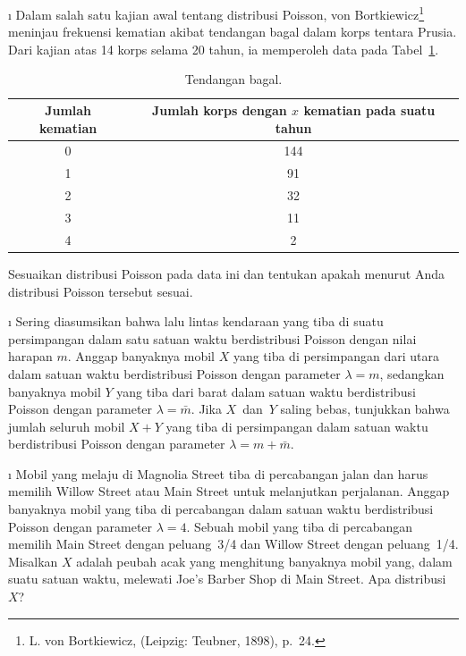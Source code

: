 \begin{LJSItem}
\i\label{exer 9.2.20} Dalam salah satu kajian awal tentang distribusi Poisson, von
Bortkiewicz\footnote{L. von Bortkiewicz,   (Leipzig: Teubner, 1898), p.\ 24.} meninjau frekuensi kematian akibat
tendangan bagal dalam korps tentara Prusia. Dari kajian atas
14 korps selama 20 tahun, ia memperoleh data pada Tabel~\ref{table 5.5}.
\begin{table}
\centering
\begin{tabular}{|c|c|}
\hline Jumlah kematian & Jumlah korps dengan $x$ kematian pada suatu tahun \\ \hline 
0 & 144 \\
1 & \hspace{.1in}91 \\ 
2 & \hspace{.1in}32 \\ 
3 & \hspace{.12in}11 \\ 
4 & \hspace{.18in}2 \\ \hline
\end{tabular}
\caption{Tendangan bagal.}
\label{table 5.5}
\end{table}
Sesuaikan distribusi Poisson pada data ini dan tentukan apakah menurut Anda distribusi
Poisson tersebut sesuai.

\i\label{exer 9.2.21} Sering diasumsikan bahwa lalu lintas kendaraan yang tiba di
suatu persimpangan dalam satu satuan waktu berdistribusi Poisson dengan nilai harapan
$m$. Anggap banyaknya mobil $X$ yang tiba di persimpangan dari utara dalam satuan
waktu berdistribusi Poisson dengan parameter $\lambda = m$, sedangkan banyaknya mobil
$Y$ yang tiba dari barat dalam satuan waktu berdistribusi Poisson dengan parameter
$\lambda = \bar m$. Jika $X$~dan~$Y$ saling bebas, tunjukkan bahwa jumlah seluruh
mobil $X + Y$ yang tiba di persimpangan dalam satuan waktu berdistribusi Poisson
dengan parameter $\lambda =  m + \bar m$.

\i\label{exer 9.2.22} Mobil yang melaju di Magnolia Street tiba di percabangan jalan
dan harus memilih Willow Street atau Main Street untuk melanjutkan perjalanan.
Anggap banyaknya mobil yang tiba di percabangan dalam satuan waktu berdistribusi
Poisson dengan parameter $\lambda = 4$. Sebuah mobil yang tiba di percabangan memilih
Main Street dengan peluang~3/4 dan Willow Street dengan peluang~1/4. Misalkan $X$
adalah peubah acak yang menghitung banyaknya mobil yang, dalam suatu satuan waktu,
melewati Joe's Barber Shop di Main Street. Apa distribusi $X$?


\end{LJSItem}
